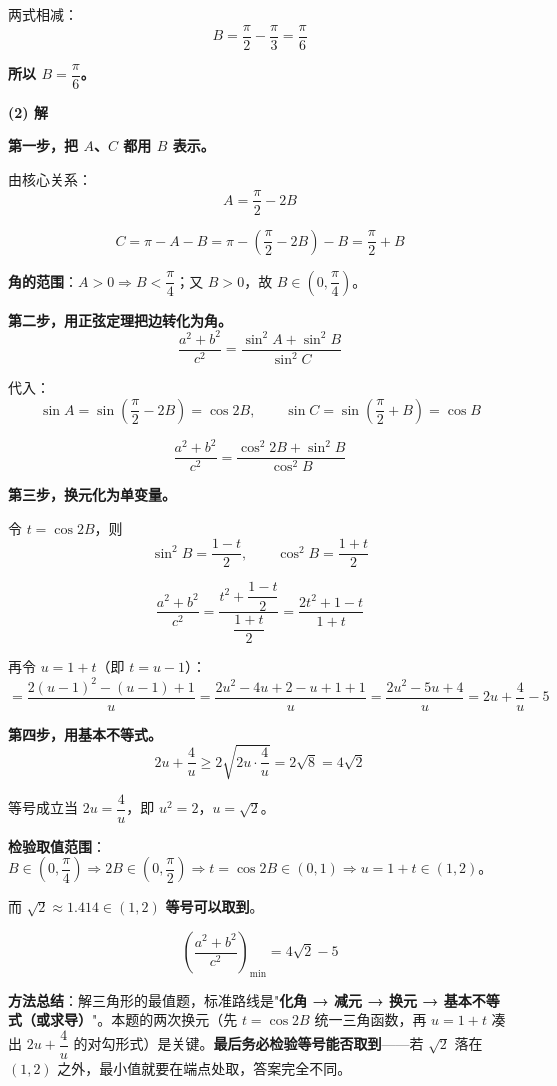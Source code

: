 \begin{answer}
两式相减：
\nopagebreak[4]
\[B=\frac\pi2-\frac\pi3=\frac\pi6\]

\textbf{所以 $B=\dfrac\pi6$。}

\par\medskip

\textbf{(2) 解}

\textbf{第一步，把 $A$、$C$ 都用 $B$ 表示。}

由核心关系：
\nopagebreak[4]
\[A=\frac\pi2-2B\]

\nopagebreak[4]
\[C=\pi-A-B=\pi-\left(\frac\pi2-2B\right)-B=\frac\pi2+B\]

\textbf{角的范围}：$A>0\Rightarrow B<\dfrac\pi4$；又 $B>0$，故 $B\in\left(0,\dfrac\pi4\right)$。

\textbf{第二步，用正弦定理把边转化为角。}
\nopagebreak[4]
\[\frac{a^{2}+b^{2}}{c^{2}}=\frac{\sin^{2}A+\sin^{2}B}{\sin^{2}C}\]

代入：
\nopagebreak[4]
\[\sin A=\sin\left(\frac\pi2-2B\right)=\cos2B,\qquad \sin C=\sin\left(\frac\pi2+B\right)=\cos B\]

\nopagebreak[4]
\[\frac{a^{2}+b^{2}}{c^{2}}=\frac{\cos^{2}2B+\sin^{2}B}{\cos^{2}B}\]

\textbf{第三步，换元化为单变量。}

令 $t=\cos2B$，则
\nopagebreak[4]
\[\sin^{2}B=\frac{1-t}2,\qquad \cos^{2}B=\frac{1+t}2\]

\nopagebreak[4]
\[\frac{a^{2}+b^{2}}{c^{2}}=\frac{t^{2}+\dfrac{1-t}2}{\dfrac{1+t}2}=\frac{2t^{2}+1-t}{1+t}\]

再令 $u=1+t$（即 $t=u-1$）：
\nopagebreak[4]
\[=\frac{2(u-1)^{2}-(u-1)+1}{u}=\frac{2u^{2}-4u+2-u+1+1}{u}=\frac{2u^{2}-5u+4}{u}=2u+\frac4u-5\]

\textbf{第四步，用基本不等式。}
\nopagebreak[4]
\[2u+\frac4u\ge2\sqrt{2u\cdot\frac4u}=2\sqrt8=4\sqrt2\]

等号成立当 $2u=\dfrac4u$，即 $u^{2}=2$，$u=\sqrt2$。

\textbf{检验取值范围}：$B\in\left(0,\dfrac\pi4\right)\Rightarrow2B\in\left(0,\dfrac\pi2\right)\Rightarrow t=\cos2B\in(0,1)\Rightarrow u=1+t\in(1,2)$。

而 $\sqrt2\approx1.414\in(1,2)$  \textbf{等号可以取到}。

\nopagebreak[4]
\[\left(\frac{a^{2}+b^{2}}{c^{2}}\right)_{\min}=4\sqrt2-5\]

\begin{gktip}
\textbf{方法总结}：解三角形的最值题，标准路线是"\textbf{化角 → 减元 → 换元 → 基本不等式（或求导）}"。本题的两次换元（先 $t=\cos2B$ 统一三角函数，再 $u=1+t$ 凑出 $2u+\dfrac4u$ 的对勾形式）是关键。\textbf{最后务必检验等号能否取到}——若 $\sqrt2$ 落在 $(1,2)$ 之外，最小值就要在端点处取，答案完全不同。
\end{gktip}



\par\medskip

\end{answer}

